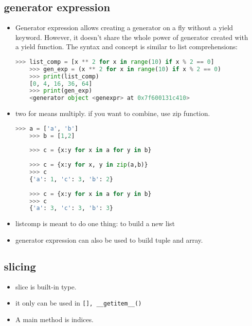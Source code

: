 \documentclass[a4paper,12pt,twoside]{book}
\begin{document}
\subsection{generator expression}
\begin{itemize}
	\item Generator expression allows creating a generator on a fly without a yield keyword. However, it doesn’t share the whole power of generator created with a yield function. The syntax and concept is similar to list comprehensions:
	\begin{lstlisting}[frame=single, language=Python]
	>>> list_comp = [x ** 2 for x in range(10) if x % 2 == 0]
	>>> gen_exp = (x ** 2 for x in range(10) if x % 2 == 0)
	>>> print(list_comp)
	[0, 4, 16, 36, 64]
	>>> print(gen_exp)
	<generator object <genexpr> at 0x7f600131c410>  
		\end{lstlisting}  
	\item two for means multiply. if you want to combine, use zip function. 
	\begin{lstlisting}[frame=single, language=Python]	
	>>> a = ['a', 'b']
	>>> b = [1,2]
	
	>>> c = {x:y for x in a for y in b}
	
	>>> c = {x:y for x, y in zip(a,b)}
	>>> c
	{'a': 1, 'c': 3, 'b': 2}
	
	>>> c = {x:y for x in a for y in b}
	>>> c
	{'a': 3, 'c': 3, 'b': 3}
		\end{lstlisting}  
	\item listcomp is meant to do one thing: to build a new list
	\item generator expression can also be used to build tuple and array.
\end{itemize}
\subsection{slicing}
\begin{itemize}
	\item slice is built-in type.
	\item it only can be used in \verb|[], __getitem__()|
	\item A main method is indices. 
\end{itemize}
\end{document}
